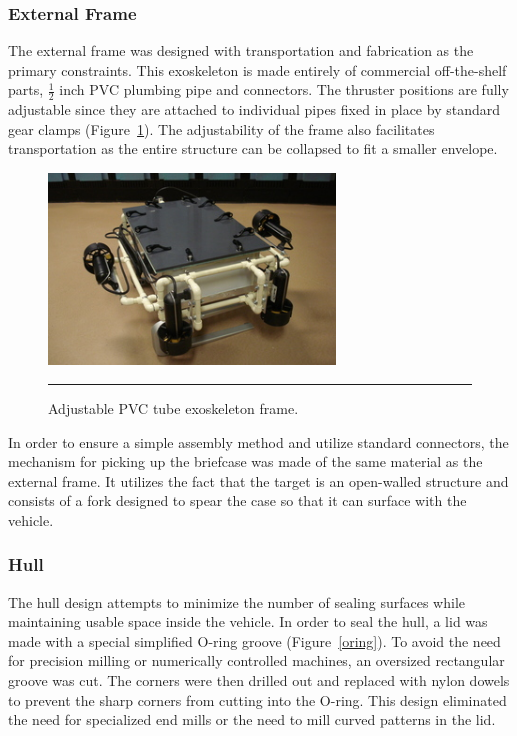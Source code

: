 \subsubsection{External Frame}
The external frame was designed with transportation and fabrication as
the primary constraints. This exoskeleton is made entirely of
commercial off-the-shelf
parts, $\frac{1}{2}$ inch PVC plumbing pipe and connectors.  The thruster positions
are fully adjustable since they are attached to individual pipes fixed
in place by standard gear clamps (Figure~\ref{adj}). The adjustability of the frame also
facilitates transportation as the entire structure can be collapsed to
fit a smaller envelope. 

\begin{figure}
\begin{center}
 \includegraphics[width=3in]{fig/dsc06455} 
\vspace{.05in}
\hrule
\caption{Adjustable PVC tube exoskeleton frame.}\label{adj}
\end{center}
\end{figure}

In order to ensure a simple assembly method and utilize standard
connectors, the mechanism for picking up the briefcase was made of the
same material as the external frame.  It utilizes the fact that the
target is an open-walled structure and consists of a fork designed to
spear the case so that it can surface with the vehicle.

\subsubsection{Hull}
The hull design attempts to minimize the number of sealing
surfaces while maintaining usable space inside the vehicle.  In order
to seal the hull, a lid was made with a special simplified O-ring
groove (Figure~\ref{oring}). To avoid the need for precision milling or numerically
controlled machines, an oversized rectangular groove was cut.  The
corners were then drilled out and replaced with nylon dowels to
prevent the sharp corners from cutting into the O-ring.  This design
eliminated the need for specialized end mills or the need to mill
curved patterns in the lid. 

